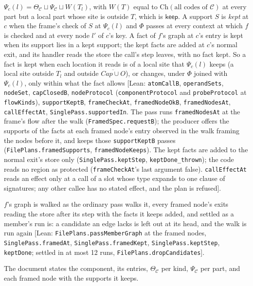 \documentclass[10pt,a4paper]{article}
\theoremstyle{definition}
\theoremstyle{remark}
\newcommand{\kw}[1]{\mathsf{#1}}
\newcommand{\keep}{\kw{keep}}
\newcommand{\lean}[1]{\texttt{\small #1}}
\newcommand{\status}[1]{\textsf{\small[#1]}}
\newcommand{\cC}{\mathcal{C}}
\begin{document}
\begin{description}[leftmargin=1.5em,style=nextline]
$\Psi_c(l)=\Theta_\cC\sqcup\Psi_\cC\sqcup W(T_l)$, with $W(T)$ equal to
$\mathrm{Ch}(\text{all codes of }\cC)$ at every part but a local part
whose site is outside $T$, which is $\keep$. A support $S$ is
\emph{kept} at $c$ when the frame's check of $S$ at $\Psi_c(l)$ and $\Phi$
passes at every context at which $f$ is checked and at every node $l'$ of
$c$'s key. A fact of
$f$'s graph at $c$'s entry is kept when its support lies in a kept
support; the kept facts are added at $c$'s normal exit, and its handler
reads the store the call's step leaves, with no fact kept. So a fact is
kept when each location it reads is of a local site that $\Psi_c(l)$
keeps (a local site outside $T_l$ and outside
$\overline{\mathit{Cap}\cup O}$), or changes, under $\Phi$ joined with
$\Psi_c(l)$, only within what the fact allows
\status{Lean: \lean{atomCallB}, \lean{operandSets}, \lean{nodeSet}, \lean{capClosedB}, \lean{nodeProtocol} (\lean{componentProtocol} and \lean{probeProtocol} at \lean{flowKinds}), \lean{supportKeptB}, \lean{frameCheckAt}, \lean{framedNodeOkB}, \lean{framedNodesAt}, \lean{callEffectAt}, \lean{SinglePass.supportedIn}. The pass runs \lean{framedNodesAt} at the frame's flow after the walk (\lean{FramedSpec.requestB}); the producer offers the supports of the facts at each framed node's entry observed in the walk framing the nodes before it, and keeps those \lean{supportKeptB} passes (\lean{FilePlans.framedSupports}, \lean{framedNodeKeeps}). The kept facts are added to the normal exit's store only (\lean{SinglePass.keptStep}, \lean{keptDone\_thrown}); the code reads no region as protected (\lean{frameCheckAt}'s last argument false). \lean{callEffectAt} reads an effect only at a call of a slot whose type expands to one clause of signatures; any other callee has no stated effect, and the plan is refused}.
\item[(B3) The framed walk] $f$'s graph is walked as the ordinary pass
walks it, every framed node's exits reading the store after its step with
the facts it keeps added, and settled as a member's run is: a candidate an
edge lacks is left out at its head, and the walk is run again
\status{Lean: \lean{FilePlans.passMemberGraph} at the framed nodes, \lean{SinglePass.framedAt}, \lean{SinglePass.framedKept}, \lean{SinglePass.keptStep}, \lean{keptDone}; settled in at most 12 runs, \lean{FilePlans.dropCandidates}}.
\item[(B4) The plan document and its decoding] The document states the
component, its entries, $\Theta_\cC$ per kind, $\Psi_\cC$ per part, and
each framed node with the supports it keeps.

\end{description}
\end{document}
